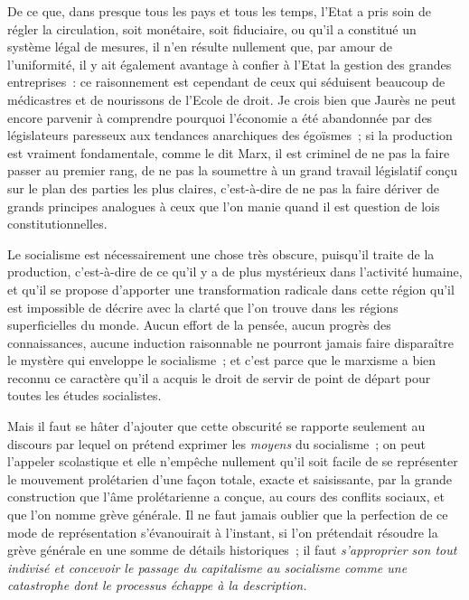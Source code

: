\documentclass[french,twoside]{book} %
\begin{document}
De ce que, dans presque tous les pays et tous les temps, l’Etat a pris soin de régler la circulation, soit monétaire, soit fiduciaire, ou qu’il a constitué un système légal de mesures, il n’en résulte nullement que, par amour de l’uniformité, il y ait également avantage à confier à l’Etat la gestion des grandes entreprises : ce raisonnement est cependant de ceux qui séduisent beaucoup de médicastres et de nourissons de l’Ecole de droit. Je crois bien que Jaurès ne peut encore parvenir à comprendre pourquoi l’économie a été abandonnée par des législateurs paresseux aux tendances anarchiques des égoïsmes ; si la production est vraiment fondamentale, comme le dit Marx, il est criminel de ne pas la faire passer au premier rang, de ne pas la soumettre à un grand travail législatif conçu sur le plan des parties les plus claires, c’est-à-dire de ne pas la faire dériver de grands principes analogues à ceux que l’on manie quand il est question de lois constitutionnelles.\par
Le socialisme est nécessairement une chose très obscure, puisqu’il traite de la production, c’est-à-dire de ce qu’il y a de plus mystérieux dans l’activité humaine, et qu’il se propose d’apporter une transformation radicale dans cette région qu’il est impossible de décrire avec la  clarté que l’on trouve dans les régions superficielles du monde. Aucun effort de la pensée, aucun progrès des connaissances, aucune induction raisonnable ne pourront jamais faire disparaître le mystère qui enveloppe le socialisme ; et c’est parce que le marxisme a bien reconnu ce caractère qu’il a acquis le droit de servir de point de départ pour toutes les études socialistes.\par
Mais il faut se hâter d’ajouter que cette obscurité se rapporte seulement au discours par lequel on prétend exprimer les \emph{moyens} du socialisme ; on peut l’appeler scolastique et elle n’empêche nullement qu’il soit facile de se représenter le mouvement prolétarien d’une façon totale, exacte et saisissante, par la grande construction que l’âme prolétarienne a conçue, au cours des conflits sociaux, et que l’on nomme grève générale. Il ne faut jamais oublier que la perfection de ce mode de représentation s’évanouirait à l’instant, si l’on prétendait résoudre la grève générale en une somme de détails historiques ; il faut \emph{s’approprier son tout indivisé et concevoir le passage du capitalisme au socialisme comme une catastrophe dont le processus échappe à la description.}\par
\end{document}
